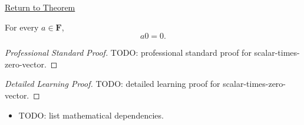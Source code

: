 \newpage
{}
\label{prf:scalar-times-zero-vector}

\begin{remark*}[Return]
\hyperref[thm:scalar-times-zero-vector]{Return to Theorem}
\end{remark*}

\begin{theorem*}[$a0=0$]
For every $a \in \mathbf{F}$,
\[
a0=0.
\]
\end{theorem*}

\begin{proof}[Professional Standard Proof]
\LRAProofBodyStart
TODO: professional standard proof for scalar-times-zero-vector.
\end{proof}

\begin{proof}[Detailed Learning Proof]
\LRAProofBodyStart
TODO: detailed learning proof for scalar-times-zero-vector.
\end{proof}

\begin{remark*}
\end{remark*}

\begin{dependencies}
\begin{itemize}
  \item TODO: list mathematical dependencies.
\end{itemize}
\end{dependencies}

\clearpage
